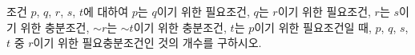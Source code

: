 조건 $p$, $q$, $r$, $s$, $t$에 대하여 $p$는 $q$이기 위한 필요조건, $q$는 $r$이기 위한 필요조건, $r$는 $s$이기 위한 충분조건, $\sim r$는 $\sim t$이기 위한 충분조건, $t$는 $p$이기 위한 필요조건일 때, $p$, $q$, $s$, $t$ 중 $r$이기 위한 필요충분조건인 것의 개수를 구하시오.
